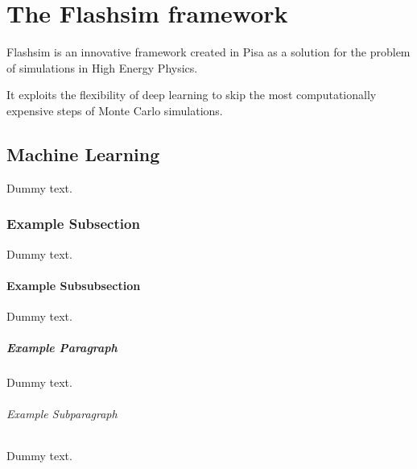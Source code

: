\chapter{The Flashsim framework}
\label{chap:chapter_4}
Flashsim is an innovative framework created in Pisa as a solution for the problem of simulations in High Energy Physics.

It exploits the flexibility of deep learning to skip the most computationally expensive steps of Monte Carlo simulations.

\section{Machine Learning}

Dummy text.

\subsection{Example Subsection}

Dummy text.

\subsubsection{Example Subsubsection}

Dummy text.

\paragraph{Example Paragraph}

Dummy text.

\subparagraph{Example Subparagraph}

Dummy text.
